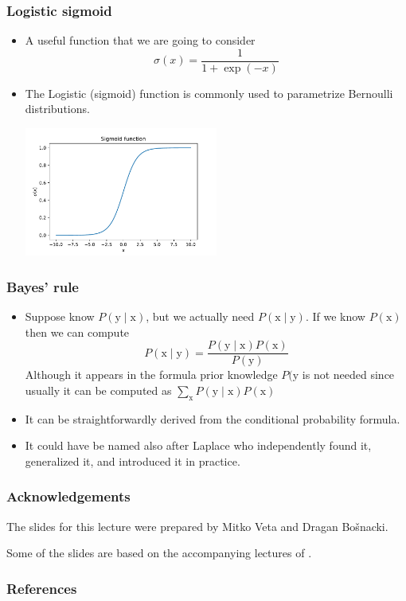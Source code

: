 \documentclass[notes]{beamer}          %
\begin{document}
\begin{frame}
\frametitle{Logistic sigmoid}
\begin{itemize}
    \item A useful function that we are going to consider
    $$\sigma(x) = \frac{1}{1 + \exp{(-x)}}$$
    \item The Logistic (sigmoid) function is commonly used to parametrize Bernoulli distributions.
    \begin{center}
    \includegraphics[width=0.5\textwidth]{figures/week_1/sigmoid.pdf}
    \end{center}

\end{itemize}
\end{frame}


\begin{frame}
\frametitle{Bayes' rule}
\begin{itemize}
    \item Suppose know $P(\text{y} \mid \text{x})$, but we actually need $P(\text{x} \mid \text{y})$. If we know $P(\text{x})$ then we can compute
    $$
        P(\text{x} \mid \text{y}) = \frac{P(\text{y} \mid \text{x})P(\text{x})}{P(\text{y})}
    $$
    Although it appears in the formula prior knowledge $P(\text{y}$ is not needed since usually it can be computed as $\sum_{\text{x}} P(\text{y} \mid \text{x})P(\text{x})$
    \item It can be straightforwardly derived from the conditional probability formula.
    \item It could have be named also after Laplace who independently found it, generalized it, and introduced it in practice.
\end{itemize}
\end{frame}


\begin{frame}
\frametitle{Acknowledgements}

The slides for this lecture were prepared by Mitko Veta and Dragan Bo{\v s}nacki. 

Some of the slides are based on the accompanying lectures of \cite{deeplearning}.

\end{frame}


\begin{frame}
\frametitle{References}
\printbibliography
\end{frame}
\end{document}
